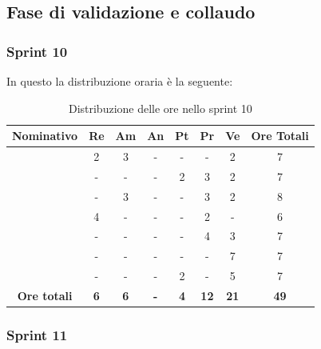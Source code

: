 \subsection{Fase di validazione e collaudo}

\subsubsection{Sprint 10}

In questo  la distribuzione oraria è la seguente:
\begin{table}[H]
		\begin{center}
			\setlength{\aboverulesep}{0pt}
			\setlength{\belowrulesep}{0pt}
			\setlength{\extrarowheight}{.75ex}
			\begin{tabular}{ c c c c c c c c }
				\rowcolor{AzzurroGruppo!30} 
				\textbf{Nominativo} & \textbf{Re} & \textbf{Am} & \textbf{An} & \textbf{Pt} & \textbf{Pr} & \textbf{Ve} & \textbf{Ore Totali}  \\
				\toprule
				\Davide    & 2 & 3 & - & - & - & 2 & 7 \\
				\Giosue    & - & - & - & 2 & 3 & 2 & 7 \\
				\Francesco & - & 3 & - & - & 3 & 2 & 8\\
				\Daniele   & 4 & - & - & - & 2 & - & 6\\
				\Lucrezia  & - & - & - & - & 4 & 3 & 7\\
				\Matteo    & - & - & - & - & - & 7 & 7\\
				\Tommaso   & - & - & - & 2 & - & 5 & 7\\
				 \textbf{Ore totali} & \textbf{6} & \textbf{6} & \textbf{-} & \textbf{4} & \textbf{12} & \textbf{21} & \textbf{49} \\
				\bottomrule
			\end{tabular}
			\caption{Distribuzione delle ore nello sprint 10}
		\end{center}
	\end{table}


\subsubsection{Sprint 11}


